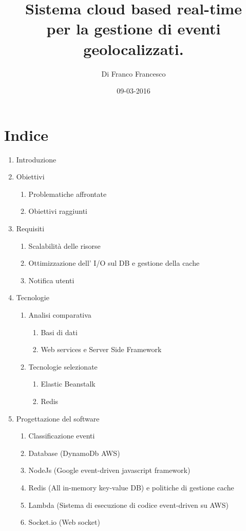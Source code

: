 \documentclass[a4paper,11pt]{report}
\title{Sistema cloud based real-time \\per la gestione di eventi geolocalizzati.}
\author{Di Franco Francesco}
\date{09-03-2016}
\begin{document}






\chapter*{Indice}


\large
\begin{enumerate}[label*=\arabic*.]
\item Introduzione %

\item Obiettivi %
\begin{enumerate}[label*=\arabic*.]
	\item Problematiche affrontate %
	\item Obiettivi raggiunti %
\end{enumerate}

\item Requisiti %
\begin{enumerate}[label*=\arabic*.]
	\item Scalabilit\`a delle risorse %
	\item Ottimizzazione dell' I/O sul DB e gestione della cache %
	\item Notifica utenti %
\end{enumerate}

\item Tecnologie %
\begin{enumerate}[label*=\arabic*.]
	\item Analisi comparativa %
	\begin{enumerate}[label*=\arabic*.]
		\item Basi di dati %
		\item Web services e Server Side Framework %
	\end{enumerate}

	\item Tecnologie selezionate %
	\begin{enumerate}[label*=\arabic*.]
		\item Elastic Beanstalk %
		\item Redis %
	\end{enumerate}
\end{enumerate}

\item Progettazione del software %
\begin{enumerate}[label*=\arabic*.]
	\item Classificazione eventi %
	\item Database (DynamoDb AWS)
	\item NodeJs (Google event-driven javascript framework)
	\item Redis (All in-memory key-value DB) e politiche di gestione cache
	\item Lambda (Sistema di esecuzione di codice event-driven su AWS)
	\item Socket.io (Web socket)
\end{enumerate}


\end{enumerate}
\end{document}
